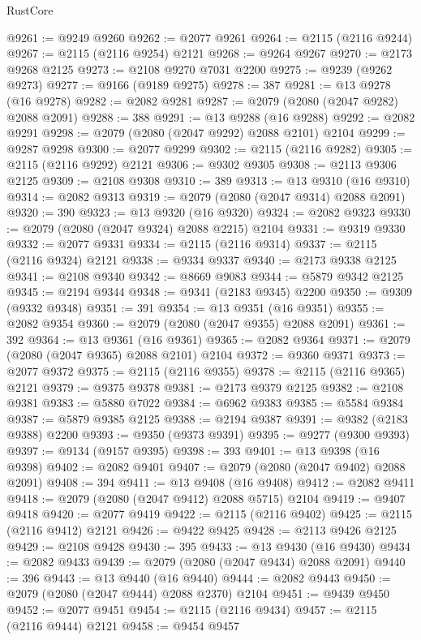 \begin{lexlean}{RustCore}
\begin{coremodule}
@9261 := @9249 @9260
@9262 := @2077 @9261
@9264 := @2115 (@2116 @9244)
@9267 := @2115 (@2116 @9254) @2121
@9268 := @9264 @9267
@9270 := @2173 @9268 @2125
@9273 := @2108 @9270 @7031 @2200
@9275 := @9239 (@9262 @9273)
@9277 := @9166 (@9189 @9275)
@9278 := 387
@9281 := @13 @9278 (@16 @9278)
@9282 := @2082 @9281
@9287 := @2079 (@2080 (@2047 @9282) @2088 @2091)
@9288 := 388
@9291 := @13 @9288 (@16 @9288)
@9292 := @2082 @9291
@9298 := @2079 (@2080 (@2047 @9292) @2088 @2101) @2104
@9299 := @9287 @9298
@9300 := @2077 @9299
@9302 := @2115 (@2116 @9282)
@9305 := @2115 (@2116 @9292) @2121
@9306 := @9302 @9305
@9308 := @2113 @9306 @2125
@9309 := @2108 @9308
@9310 := 389
@9313 := @13 @9310 (@16 @9310)
@9314 := @2082 @9313
@9319 := @2079 (@2080 (@2047 @9314) @2088 @2091)
@9320 := 390
@9323 := @13 @9320 (@16 @9320)
@9324 := @2082 @9323
@9330 := @2079 (@2080 (@2047 @9324) @2088 @2215) @2104
@9331 := @9319 @9330
@9332 := @2077 @9331
@9334 := @2115 (@2116 @9314)
@9337 := @2115 (@2116 @9324) @2121
@9338 := @9334 @9337
@9340 := @2173 @9338 @2125
@9341 := @2108 @9340
@9342 := @8669 @9083
@9344 := @5879 @9342 @2125
@9345 := @2194 @9344
@9348 := @9341 (@2183 @9345) @2200
@9350 := @9309 (@9332 @9348)
@9351 := 391
@9354 := @13 @9351 (@16 @9351)
@9355 := @2082 @9354
@9360 := @2079 (@2080 (@2047 @9355) @2088 @2091)
@9361 := 392
@9364 := @13 @9361 (@16 @9361)
@9365 := @2082 @9364
@9371 := @2079 (@2080 (@2047 @9365) @2088 @2101) @2104
@9372 := @9360 @9371
@9373 := @2077 @9372
@9375 := @2115 (@2116 @9355)
@9378 := @2115 (@2116 @9365) @2121
@9379 := @9375 @9378
@9381 := @2173 @9379 @2125
@9382 := @2108 @9381
@9383 := @5880 @7022
@9384 := @6962 @9383
@9385 := @5584 @9384
@9387 := @5879 @9385 @2125
@9388 := @2194 @9387
@9391 := @9382 (@2183 @9388) @2200
@9393 := @9350 (@9373 @9391)
@9395 := @9277 (@9300 @9393)
@9397 := @9134 (@9157 @9395)
@9398 := 393
@9401 := @13 @9398 (@16 @9398)
@9402 := @2082 @9401
@9407 := @2079 (@2080 (@2047 @9402) @2088 @2091)
@9408 := 394
@9411 := @13 @9408 (@16 @9408)
@9412 := @2082 @9411
@9418 := @2079 (@2080 (@2047 @9412) @2088 @5715) @2104
@9419 := @9407 @9418
@9420 := @2077 @9419
@9422 := @2115 (@2116 @9402)
@9425 := @2115 (@2116 @9412) @2121
@9426 := @9422 @9425
@9428 := @2113 @9426 @2125
@9429 := @2108 @9428
@9430 := 395
@9433 := @13 @9430 (@16 @9430)
@9434 := @2082 @9433
@9439 := @2079 (@2080 (@2047 @9434) @2088 @2091)
@9440 := 396
@9443 := @13 @9440 (@16 @9440)
@9444 := @2082 @9443
@9450 := @2079 (@2080 (@2047 @9444) @2088 @2370) @2104
@9451 := @9439 @9450
@9452 := @2077 @9451
@9454 := @2115 (@2116 @9434)
@9457 := @2115 (@2116 @9444) @2121
@9458 := @9454 @9457

\end{coremodule}
\end{lexlean}
